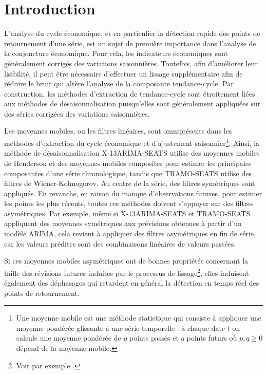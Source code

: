 \documentclass[
  12pt,
  french,
  12pt,a4paper]{article}
\newcommand\1{\mathds{1}}
\begin{document}
\newpage

{
\hypersetup{linkcolor=}
\setcounter{tocdepth}{3}
\tableofcontents
}
\hypertarget{introduction}{%
\section*{Introduction}\label{introduction}}

L'analyse du cycle économique, et en particulier la détection rapide des points de retournement d'une série, est un sujet de première importance dans l'analyse de la conjoncture économique.
Pour cela, les indicateurs économiques sont généralement corrigés des variations saisonnières.
Toutefois, afin d'améliorer leur lisibilité, il peut être nécessaire d'effectuer un lissage supplémentaire afin de réduire le bruit qui altère l'analyse de la composante tendance-cycle.
Par construction, les méthodes d'extraction de tendance-cycle sont étroitement liées aux méthodes de désaisonnalisation puisqu'elles sont généralement appliquées sur des séries corrigées des variations saisonnières.

Les moyennes mobiles, ou les filtres linéaires, sont omniprésents dans les méthodes d'extraction du cycle économique et d'ajustement saisonnier\footnote{
  Une moyenne mobile est une méthode statistique qui consiste à appliquer une moyenne pondérée glissante à une série temporelle : à chaque date \(t\) on calcule une moyenne pondérée de \(p\) points passés et \(q\) points futurs où \(p,q\geq0\) dépend de la moyenne mobile.}.
Ainsi, la méthode de désaisonnalisation X-13ARIMA-SEATS utilise des moyennes mobiles de Henderson et des moyennes mobiles composites pour estimer les principales composantes d'une série chronologique, tandis que TRAMO-SEATS utilise des filtres de Wiener-Kolmogorov.
Au centre de la série, des filtres symétriques sont appliqués.
En revanche, en raison du manque d'observations futures, pour estimer les points les plus récents, toutes ces méthodes doivent s'appuyer sur des filtres asymétriques.
Par exemple, même si X-13ARIMA-SEATS et TRAMO-SEATS appliquent des moyennes symétriques aux prévisions obtenues à partir d'un modèle ARIMA, cela revient à appliquer des filtres asymétriques en fin de série, car les valeurs prédites sont des combinaisons linéaires de valeurs passées.

Si ces moyennes mobiles asymétriques ont de bonnes propriétés concernant la taille des révisions futures induites par le processus de lissage\footnote{Voir par exemple \textcite{pierce1980SA}.}, elles induisent également des déphasages qui retardent en général la détection en temps réel des points de retournement.
\end{document}
